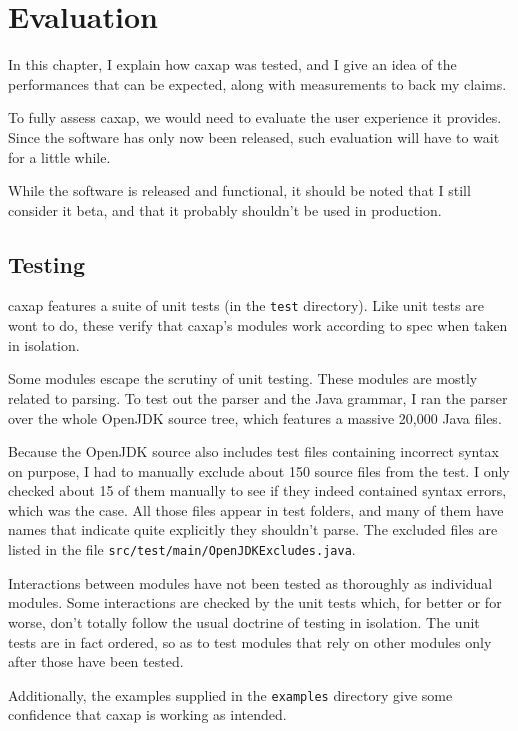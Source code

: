 \chapter{Evaluation}

In this chapter, I explain how caxap was tested, and I give an idea of the
performances that can be expected, along with measurements to back my claims.

To fully assess caxap, we would need to evaluate the user experience it
provides. Since the software has only now been released, such evaluation will
have to wait for a little while.

While the software is released and functional, it should be noted that I still
consider it beta, and that it probably shouldn't be used in production.

\section{Testing}
\label{testing}

caxap features a suite of unit tests (in the \texttt{test} directory). Like unit
tests are wont to do, these verify that caxap's modules work according to spec
when taken in isolation.

Some modules escape the scrutiny of unit testing. These modules are mostly
related to parsing. To test out the parser and the Java grammar, I ran the
parser over the whole OpenJDK source tree, which features a massive 20,000 Java
files.

Because the OpenJDK source also includes test files containing incorrect syntax
on purpose, I had to manually exclude about 150 source files from the test. I
only checked about 15 of them manually to see if they indeed contained syntax
errors, which was the case. All those files appear in test folders, and many of
them have names that indicate quite explicitly they shouldn't parse. The
excluded files are listed in the file
\texttt{src/test/main/OpenJDKExcludes.java}.

Interactions between modules have not been tested as thoroughly as individual
modules. Some interactions are checked by the unit tests which, for better or
for worse, don't totally follow the usual doctrine of testing in isolation. The
unit tests are in fact ordered, so as to test modules that rely on other modules
only after those have been tested.

Additionally, the examples supplied in the \texttt{examples} directory give some
confidence that caxap is working as intended.

